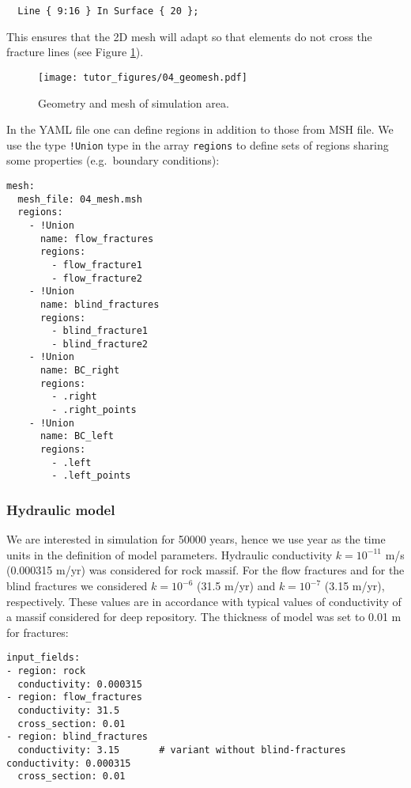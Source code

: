 \begin{verbatim}
  Line { 9:16 } In Surface { 20 };
\end{verbatim}

This ensures that the 2D mesh will adapt so that elements do not cross
the fracture lines (see Figure \ref{fig:mesh}).

\begin{figure}[htbp]
\centering
\texttt{[image: tutor\_figures/04\_geomesh.pdf]}
\caption{Geometry and mesh of simulation area.\label{fig:mesh}}
\end{figure}

In the YAML file one can define regions in addition to those from MSH
file. We use the type \texttt{!Union} type in the array \texttt{regions}
to define sets of regions sharing some properties (e.g.~boundary
conditions):

\begin{verbatim}
mesh:
  mesh_file: 04_mesh.msh
  regions:
    - !Union
      name: flow_fractures
      regions:
        - flow_fracture1
        - flow_fracture2
    - !Union
      name: blind_fractures
      regions:
        - blind_fracture1
        - blind_fracture2
    - !Union
      name: BC_right
      regions:
        - .right
        - .right_points
    - !Union
      name: BC_left
      regions:
        - .left
        - .left_points
\end{verbatim}

\subsubsection{Hydraulic model}\label{hydraulic-model}

We are interested in simulation for 50000 years, hence we use year as
the time units in the definition of model parameters. Hydraulic
conductivity \(k = 10^{-11}\) m/s (0.000315 m/yr) was considered for
rock massif. For the flow fractures and for the blind fractures we
considered \(k = 10^{-6}\) (31.5 m/yr) and \(k = 10^{-7}\) (3.15 m/yr),
respectively. These values are in accordance with typical values of
conductivity of a massif considered for deep repository. The thickness
of model was set to 0.01 m for fractures:

\begin{verbatim}
input_fields:
- region: rock
  conductivity: 0.000315
- region: flow_fractures
  conductivity: 31.5
  cross_section: 0.01
- region: blind_fractures
  conductivity: 3.15       # variant without blind-fractures conductivity: 0.000315
  cross_section: 0.01
\end{verbatim}

